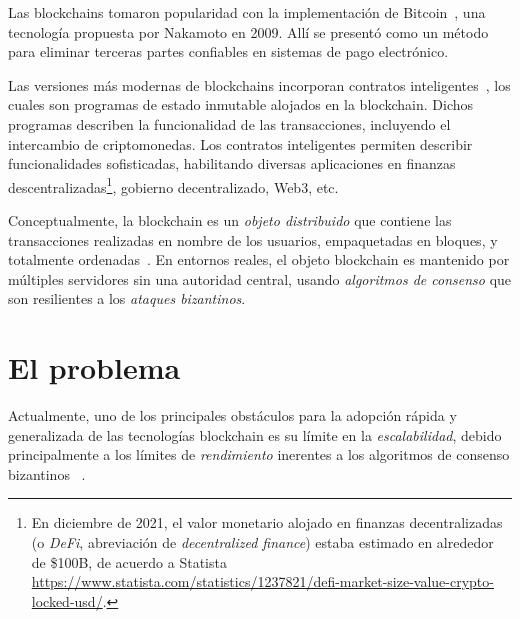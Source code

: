 Las blockchains tomaron
popularidad con la implementación de Bitcoin~\cite{nakamoto06bitcoin},
una tecnología propuesta por Nakamoto en 2009.
Allí se presentó como un método para eliminar terceras partes confiables en sistemas
de pago electrónico.
%

Las versiones más modernas de blockchains incorporan contratos inteligentes~\cite{szabo96smart,wood2014ethereum},
los cuales son programas de estado inmutable alojados en la blockchain. Dichos
programas describen la funcionalidad de las transacciones, incluyendo el intercambio
de criptomonedas.
%
Los contratos inteligentes permiten describir funcionalidades sofisticadas, habilitando
diversas aplicaciones en finanzas descentralizadas\footnote{En diciembre de 2021,
el valor monetario alojado en finanzas decentralizadas (o \emph{DeFi}, abreviación de \emph{decentralized finance})
estaba estimado en alrededor de \$100B, de acuerdo a Statista
\url{https://www.statista.com/statistics/1237821/defi-market-size-value-crypto-locked-usd/}.},
gobierno decentralizado, Web3, etc.
%

Conceptualmente, la blockchain es un \textit{objeto distribuido}
que contiene las transacciones realizadas
en nombre de los usuarios, empaquetadas en bloques, y totalmente
ordenadas~\cite{anta2018formalizing,anta2021principles}.
%
En entornos reales, el objeto blockchain es mantenido por múltiples servidores
sin una autoridad central, usando \emph{algoritmos de consenso} que son resilientes a los
\emph{ataques bizantinos}.
%



\section{El problema}

Actualmente, uno de los principales obstáculos para la adopción rápida y generalizada
de las tecnologías blockchain es su límite en la \emph{escalabilidad}, debido principalmente a los límites
de \emph{rendimiento} inerentes a los algoritmos de consenso bizantinos
~\cite{Tyagi@BlockchainScalabilitySol,Croman2016ScalingDecentralizedBlockchain}.

